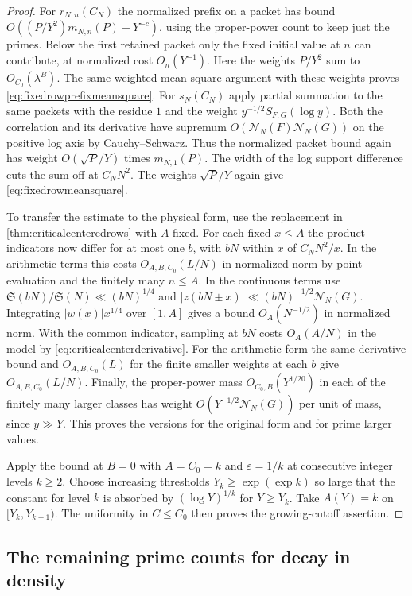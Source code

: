 \documentclass[11pt,a4paper]{article}
\numberwithin{equation}{section}
\newcommand{\SSS}{\mathfrak S}
\newcommand{\NN}{\mathcal N_N}
\begin{document}
\begin{proof}
For $r_{N,n}(C_N)$ the normalized prefix on a packet
has bound $O((P/Y^2)m_{N,n}(P)+Y^{-c})$, using the
proper-power count to keep just the primes.
Below the first retained packet only the fixed initial
value at $n$ can contribute, at normalized cost $O_n(Y^{-1})$.
Here the weights $P/Y^2$ sum to $O_{C_0}(\lambda^B)$.
The same weighted mean-square argument with these
weights proves \cref{eq:fixedrowprefixmeansquare}.
For $s_N(C_N)$ apply partial summation to the same packets
with the residue $1$ and the weight $y^{-1/2}S_{F,G}(\log y)$.
Both the correlation and its derivative have supremum
$O(\NN(F)\NN(G))$ on the positive log axis by
Cauchy--Schwarz. Thus the normalized packet bound again
has weight $O(\sqrt P/Y)$ times $m_{N,1}(P)$.
The width of the log support difference cuts the sum off
at $C_NN^2$. The weights $\sqrt P/Y$ again give
\cref{eq:fixedrowmeansquare}.

To transfer the estimate to the physical form, use the
replacement in \cref{thm:criticalcenteredrows} with $A$
fixed. For each fixed $x\le A$ the product indicators now
differ for at most one $b$, with $bN$ within $x$ of
$C_NN^2/x$. In the arithmetic terms this costs
$O_{A,B,C_0}(L/N)$ in normalized norm by point
evaluation and the finitely many $n\le A$.
In the continuous terms use $\SSS(bN)/\SSS(N)\ll(bN)^{1/4}$
and $|z(bN\pm x)|\ll (bN)^{-1/2}\NN(G)$.
Integrating $|w(x)|x^{1/4}$ over $[1,A]$ gives a bound
$O_A(N^{-1/2})$ in normalized norm. With the common
indicator, sampling at $bN$ costs $O_A(A/N)$ in the
model by \cref{eq:criticalcenterderivative}.
For the arithmetic form the same derivative bound and
$O_{A,B,C_0}(L)$ for the finite smaller weights at
each $b$ give $O_{A,B,C_0}(L/N)$.
Finally, the proper-power mass $O_{C_0,B}(Y^{1/20})$
in each of the finitely many larger classes has weight
$O(Y^{-1/2}\NN(G))$ per unit of mass, since $y\gg Y$.
This proves the versions for the original form and for
prime larger values.

Apply the bound at $B=0$ with $A=C_0=k$ and
$\varepsilon=1/k$ at consecutive
integer levels $k\ge2$. Choose increasing thresholds
$Y_k\ge\exp(\exp k)$ so large that the constant for
level $k$ is absorbed by $(\log Y)^{1/k}$ for $Y\ge Y_k$.
Take $A(Y)=k$ on $[Y_k,Y_{k+1})$. The uniformity in
$C\le C_0$ then proves the growing-cutoff assertion.
\end{proof}

\subsection{The remaining prime counts for decay in density}
\end{document}
